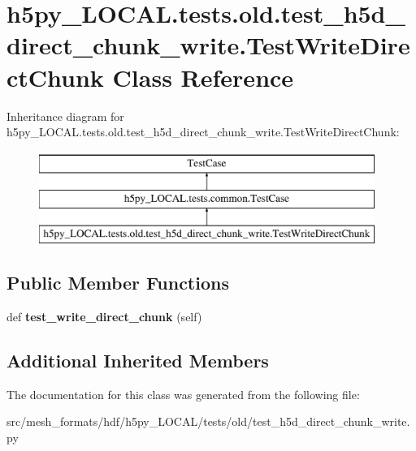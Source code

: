 \hypertarget{classh5py__LOCAL_1_1tests_1_1old_1_1test__h5d__direct__chunk__write_1_1TestWriteDirectChunk}{}\section{h5py\+\_\+\+L\+O\+C\+A\+L.\+tests.\+old.\+test\+\_\+h5d\+\_\+direct\+\_\+chunk\+\_\+write.\+Test\+Write\+Direct\+Chunk Class Reference}
\label{classh5py__LOCAL_1_1tests_1_1old_1_1test__h5d__direct__chunk__write_1_1TestWriteDirectChunk}
Inheritance diagram for h5py\+\_\+\+L\+O\+C\+A\+L.\+tests.\+old.\+test\+\_\+h5d\+\_\+direct\+\_\+chunk\+\_\+write.\+Test\+Write\+Direct\+Chunk\+:\begin{figure}[H]
\begin{center}
\leavevmode
\includegraphics[height=3.000000cm]{classh5py__LOCAL_1_1tests_1_1old_1_1test__h5d__direct__chunk__write_1_1TestWriteDirectChunk}
\end{center}
\end{figure}
\subsection*{Public Member Functions}
\begin{DoxyCompactItemize}
\item 
\mbox{\label{classh5py__LOCAL_1_1tests_1_1old_1_1test__h5d__direct__chunk__write_1_1TestWriteDirectChunk_aae2f55f9fb6f283711f5d124cb9f2c08}} 
def {\bfseries test\+\_\+write\+\_\+direct\+\_\+chunk} (self)
\end{DoxyCompactItemize}
\subsection*{Additional Inherited Members}


The documentation for this class was generated from the following file\+:\begin{DoxyCompactItemize}
\item 
src/mesh\+\_\+formats/hdf/h5py\+\_\+\+L\+O\+C\+A\+L/tests/old/test\+\_\+h5d\+\_\+direct\+\_\+chunk\+\_\+write.\+py\end{DoxyCompactItemize}
